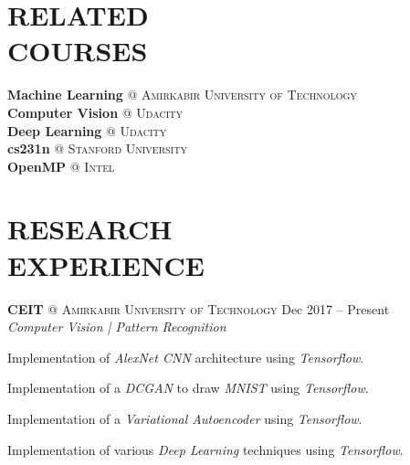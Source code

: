 \documentclass[margin, 10pt]{res} %
\begin{document}
\begin{resume}
  	\section{RELATED \\ COURSES}
	\textbf{Machine Learning} \textsc{@} \textsc{Amirkabir University of Technology}\\
	\textbf{Computer Vision} \textsc{@} \textsc{Udacity}\\
	\textbf{Deep Learning} \textsc{@} \textsc{Udacity}\\
	\textbf{cs231n} \textsc{@} \textsc{Stanford University}\\
	\textbf{OpenMP} \textsc{@} \textsc{Intel}\\
    \section{RESEARCH \\ EXPERIENCE} 

	\textbf{CEIT} \textsc{@} \textsc{Amirkabir University of Technology}
	\hfill {Dec 2017 -- Present}\\
	\textit{Computer Vision | Pattern Recognition}
	\vspace{0.15cm}
	\begin{innerlist}
		
		\item Implementation of \textit{AlexNet CNN} architecture using \textit{Tensorflow}.
		\href{https://github.com/aligholamee/AlexNet-Tensorflow}{\hfill{\UrlFont[code]}}
		
		\item Implementation of a \textit{DCGAN} to draw \textit{MNIST} using \textit{Tensorflow}.
		\href{https://github.com/aligholamee/MNIST-Drawer-DCGAN}{\hfill{\UrlFont[code]}}
		
		\item Implementation of a \textit{Variational Autoencoder} 	using \textit{Tensorflow}.
		\href{https://github.com/aligholamee/MNIST-Drawer-VAE}{\hfill{\UrlFont[code]}}
		
		\item Implementation of various \textit{Deep Learning} techniques using \textit{Tensorflow}.
		\href{https://github.com/aligholamee/notMNIST}{\hfill{\UrlFont[code]}}
		
	\end{innerlist}


\end{resume}
\end{document}
